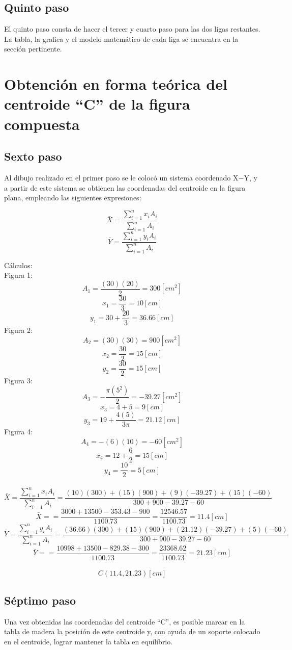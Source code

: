 \documentclass[12pt, titlepage]{report}
\begin{document}
    \subsection*{Quinto paso}
    El quinto paso consta de hacer el tercer y cuarto paso para las dos ligas restantes. La tabla, la grafica y el modelo matemático de cada liga se encuentra en la sección pertinente. 

    \hfill
    \section{Obtención en forma teórica del centroide ``C'' de la figura compuesta}
    \subsection*{Sexto paso}
    Al dibujo realizado en el primer paso se le colocó un sistema coordenado X$-$Y, y a partir de este sistema se obtienen las coordenadas del centroide en la figura plana, empleando las siguientes expresiones:

    $$ \bar{X}=\frac{\sum_{i= 1}^{n} x_{i}A_{i}}{\sum_{i= 1}^{n}A_{i}}$$
    $$ \bar{Y}=\frac{\sum_{i= 1}^{n} y_{i}A_{i}}{\sum_{i= 1}^{n}A_{i}}$$

    Cálculos:\\
    Figura 1:
    $$A_{1}=\frac{(30)(20)}{2}=300 [cm^2]$$
    $$x_{1}=\frac{30}{3}=10[cm]$$
    $$y_{1}=30+\frac{20}{3}=36.66[cm]$$
    Figura 2:
    $$A_{2}=(30)(30)=900[cm^2]$$
    $$x_{2}=\frac{30}{2}=15[cm]$$
    $$y_{2}=\frac{30}{2}=15[cm]$$
    Figura 3:
    $$A_{3}=-\frac{\pi(5^2)}{2}=-39.27[cm^2]$$
    $$x_{3}=4+5=9[cm]$$
    $$y_{3}=19+\frac{4(5)}{3\pi}=21.12[cm]$$
    Figura 4:
    $$A_{4}=-(6)(10)=-60[cm^2]$$
    $$x_{4}=12+\frac{6}{2}=15[cm]$$
    $$y_{4}=\frac{10}{2}=5[cm]$$\\
    $$ \bar{X}=\frac{\sum_{i= 1}^{n} x_{i}A_{i}}{\sum_{i= 1}^{n}A_{i}} = \frac{(10)(300)+(15)(900)+(9)(-39.27)+(15)(-60)}{300+900-39.27-60}$$
    $$ \bar{X}==\frac{3000+13500-353.43-900}{1100.73}=\frac{12546.57}{1100.73}=11.4[cm]$$
    $$ \bar{Y}=\frac{\sum_{i= 1}^{n} y_{i}A_{i}}{\sum_{i= 1}^{n}A_{i}} = \frac{(36.66)(300)+(15)(900)+(21.12)(-39.27)+(5)(-60)}{300+900-39.27-60}$$
    $$ \bar{Y}==\frac{10998+13500-829.38-300}{1100.73}=\frac{23368.62}{1100.73}=21.23[cm]$$ \\
    $$C(11.4, 21.23) [cm]$$

    \newpage
    \subsection*{Séptimo paso}
    Una vez obtenidas las coordenadas del centroide ``C'', es posible marcar en la tabla de madera la posición de este centroide y, con ayuda de un soporte colocado en el centroide, lograr mantener la tabla en equilibrio.
\end{document}
